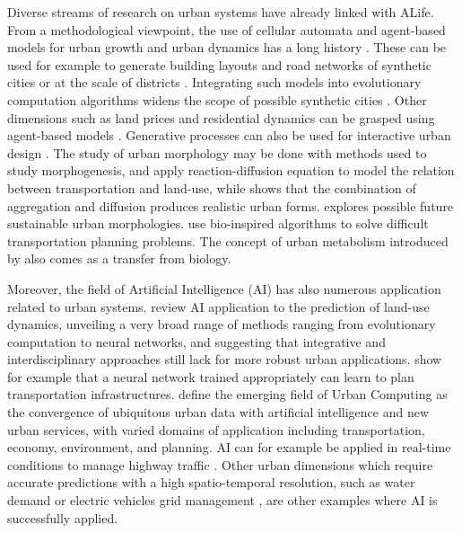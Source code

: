 \documentclass[10pt]{article}
\begin{document}
Diverse streams of research on urban systems have already linked with ALife. From a methodological viewpoint, the use of cellular automata and agent-based models for urban growth and urban dynamics has a long history \cite{torrens2003automata}. These can be used for example to generate building layouts and road networks of synthetic cities \citep{kato1998alife} or at the scale of districts \citep{raimbault2019generating}. Integrating such models into evolutionary computation algorithms widens the scope of possible synthetic cities \citep{kato2000modeling}. Other dimensions such as land prices and residential dynamics can be grasped using agent-based models \citep{takizawa2000simulation}. Generative processes can also be used for interactive urban design \citep{openshaw1995developing}. The study of urban morphology may be done with methods used to study morphogenesis, and \cite{medda2009morphogenetic} apply reaction-diffusion equation to model the relation between transportation and land-use, while \cite{raimbault2018calibration} shows that the combination of aggregation and diffusion produces realistic urban forms. \cite{d2013simulating} explores possible future sustainable urban morphologies. \cite{lucic2002transportation} use bio-inspired algorithms to solve difficult transportation planning problems. The concept of urban metabolism introduced by \cite{olsen1982urban} also comes as a transfer from biology.


Moreover, the field of Artificial Intelligence (AI) has also numerous application related to urban systems. \cite{wu2010artificial} review AI application to the prediction of land-use dynamics, unveiling a very broad range of methods ranging from evolutionary computation to neural networks, and suggesting that integrative and interdisciplinary approaches still lack for more robust urban applications. \cite{white1989artificial} show for example that a neural network trained appropriately can learn to plan transportation infrastructures. \cite{zheng2014urban} define the emerging field of Urban Computing as the convergence of ubiquitous urban data with artificial intelligence and new urban services, with varied domains of application including transportation, economy, environment, and planning. AI can for example be applied in real-time conditions to manage highway traffic \citep{ma2009real}. Other urban dimensions which require accurate predictions with a high spatio-temporal resolution, such as water demand \citep{adamowski2010comparison} or electric vehicles grid management \citep{rigas2014managing}, are other examples where AI is successfully applied.
\end{document}
